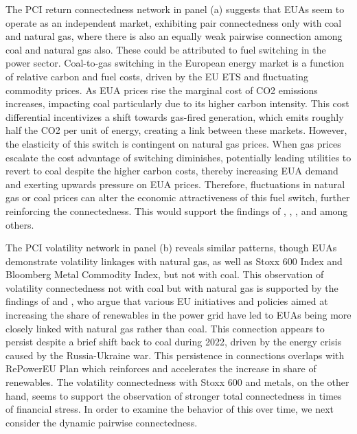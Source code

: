 \documentclass[preprint, 3p,
authoryear]{elsarticle} %
\begin{document}
The PCI return connectedness network in panel (a) suggests that EUAs
seem to operate as an independent market, exhibiting pair connectedness
only with coal and natural gas, where there is also an equally weak
pairwise connection among coal and natural gas also. These could be
attributed to fuel switching in the power sector. Coal-to-gas switching
in the European energy market is a function of relative carbon and fuel
costs, driven by the EU ETS and fluctuating commodity prices. As EUA
prices rise the marginal cost of CO2 emissions increases, impacting coal
particularly due to its higher carbon intensity. This cost differential
incentivizes a shift towards gas-fired generation, which emits roughly
half the CO2 per unit of energy, creating a link between these markets.
However, the elasticity of this switch is contingent on natural gas
prices. When gas prices escalate the cost advantage of switching
diminishes, potentially leading utilities to revert to coal despite the
higher carbon costs, thereby increasing EUA demand and exerting upwards
pressure on EUA prices. Therefore, fluctuations in natural gas or coal
prices can alter the economic attractiveness of this fuel switch,
further reinforcing the connectedness. This would support the findings
of \citet{bertrand_carbon_2014}, \citet{hintermann_allowance_2010},
\citet{creti_carbon_2012}, and \citet{pettersson_fuel_2012} among
others.

The PCI volatility network in panel (b) reveals similar patterns, though
EUAs demonstrate volatility linkages with natural gas, as well as Stoxx
600 Index and Bloomberg Metal Commodity Index, but not with coal. This
observation of volatility connectedness not with coal but with natural
gas is supported by the findings of \citet{falbo_renewables_2019} and
\citet{bertrand_carbon_2014}, who argue that various EU initiatives and
policies aimed at increasing the share of renewables in the power grid
have led to EUAs being more closely linked with natural gas rather than
coal. This connection appears to persist despite a brief shift back to
coal during 2022, driven by the energy crisis caused by the
Russia-Ukraine war. This persistence in connections overlaps with
RePowerEU Plan which reinforces and accelerates the increase in share of
renewables. The volatility connectedness with Stoxx 600 and metals, on
the other hand, seems to support the observation of stronger total
connectedness in times of financial stress. In order to examine the
behavior of this over time, we next consider the dynamic pairwise
connectedness.
\end{document}
